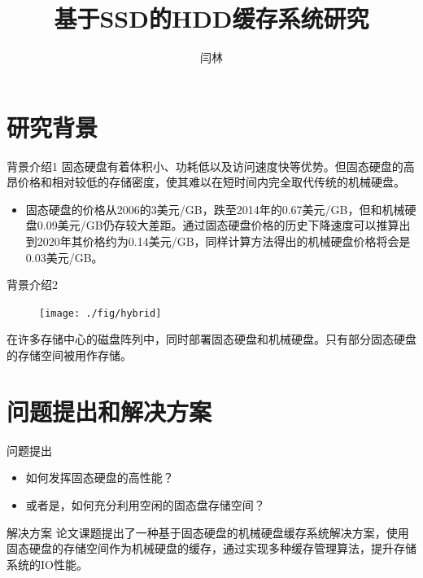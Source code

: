 \documentclass[compress]{beamer}
\title{基于SSD的HDD缓存系统研究}
\author{闫林}
\institute{
计算机学院\\
西安电子科技大学\\
\vspace{5mm}
指导教师：刘凯教授
}
\begin{document}
\begin{frame}[plain] %
  \titlepage
\end{frame}


\section{研究背景}
\begin{frame}{背景介绍1}
固态硬盘有着体积小、功耗低以及访问速度快等优势。但固态硬盘的高昂价格和相对较低的存储密度，使其难以在短时间内完全取代传统的机械硬盘。
\begin{itemize}
    \item 固态硬盘的价格从2006的3美元/GB，跌至2014年的0.67美元/GB，但和机械硬盘0.09美元/GB仍存较大差距。通过固态硬盘价格的历史下降速度可以推算出到2020年其价格约为0.14美元/GB，同样计算方法得出的机械硬盘价格将会是0.03美元/GB。
\end{itemize}
\end{frame}

\begin{frame}{背景介绍2}
\begin{figure}
\texttt{[image: ./fig/hybrid]}
\end{figure}
在许多存储中心的磁盘阵列中，同时部署固态硬盘和机械硬盘。只有部分固态硬盘的存储空间被用作存储。
\end{frame}

\section{问题提出和解决方案}
\begin{frame}{问题提出}
\begin{itemize}
    \item 如何发挥固态硬盘的高性能？
    \item 或者是，如何充分利用空闲的固态盘存储空间？
\end{itemize}
\end{frame}

\begin{frame}{解决方案}
论文课题提出了一种基于固态硬盘的机械硬盘缓存系统解决方案，使用固态硬盘的存储空间作为机械硬盘的缓存，通过实现多种缓存管理算法，提升存储系统的IO性能。
\end{frame}
\end{document}
